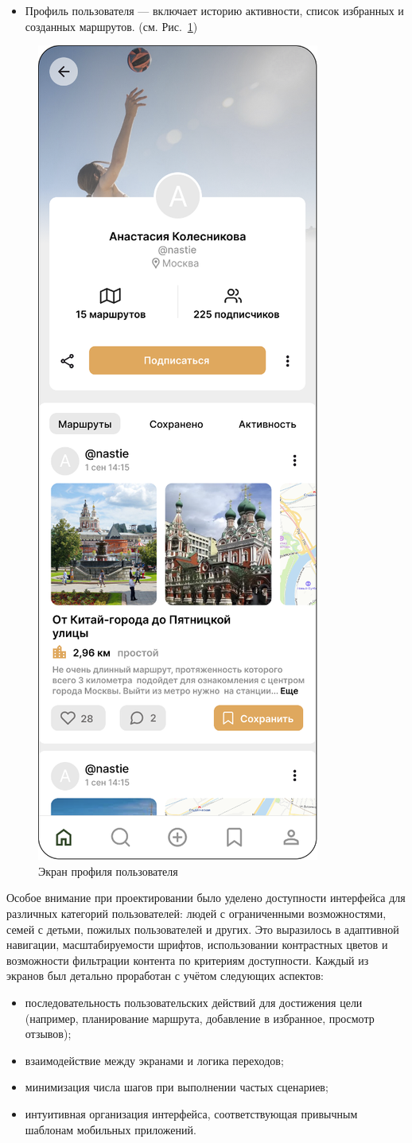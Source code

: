 \begin{itemize}
    \item Профиль пользователя — включает историю активности, список избранных и созданных маршрутов. (см. Рис.~\ref{fig:ui_screen_9})
\end{itemize}
\begin{figure}[H]
        \centering
        \includegraphics[width=0.4\linewidth]{Images/ui/Picture9.png}
        \caption{Экран профиля пользователя}
        \label{fig:ui_screen_9}
\end{figure}
Особое внимание при проектировании было уделено доступности интерфейса для различных категорий пользователей: людей с ограниченными возможностями, семей с детьми, пожилых пользователей и других. Это выразилось в адаптивной навигации, масштабируемости шрифтов, использовании контрастных цветов и возможности фильтрации контента по критериям доступности.
Каждый из экранов был детально проработан с учётом следующих аспектов:
\begin{itemize}
    \item последовательность пользовательских действий для достижения цели (например, планирование маршрута, добавление в избранное, просмотр отзывов);
    \item взаимодействие между экранами и логика переходов;
    \item минимизация числа шагов при выполнении частых сценариев;
    \item интуитивная организация интерфейса, соответствующая привычным шаблонам мобильных приложений.
\end{itemize}

